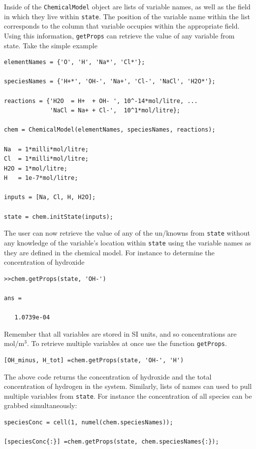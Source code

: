 \documentclass{article}
\begin{document}
Inside of the \verb|ChemicalModel| object are lists of variable names, as well as the field in which they live within \verb|state|. The position of the variable name within the list corresponds to the column that variable occupies within the appropriate field. Using this information, \verb|getProps| can retrieve the value of any variable from state. Take the simple example
\begin{lstlisting}
elementNames = {'O', 'H', 'Na*', 'Cl*'};

speciesNames = {'H+*', 'OH-', 'Na+', 'Cl-', 'NaCl', 'H2O*'};

reactions = {'H2O  = H+  + OH- ', 10^-14*mol/litre, ...
             'NaCl = Na+ + Cl-',  10^1*mol/litre};

chem = ChemicalModel(elementNames, speciesNames, reactions);

Na  = 1*milli*mol/litre;
Cl  = 1*milli*mol/litre;
H2O = 1*mol/litre;
H   = 1e-7*mol/litre;

inputs = [Na, Cl, H, H2O];

state = chem.initState(inputs);
\end{lstlisting}
The user can now retrieve the value of any of the un/knowns from \verb|state| without any knowledge of the variable's location within \verb|state| using the variable names as they are defined in the chemical model. For instance to determine the concentration of hydroxide

\begin{lstlisting}
>>chem.getProps(state, 'OH-')

ans =

   1.0739e-04
\end{lstlisting}
Remember that all variables are stored in SI units, and so concentrations are mol/m$^3$. To retrieve multiple variables at once use the function \verb|getProps|.

\begin{lstlisting}
[OH_minus, H_tot] =chem.getProps(state, 'OH-', 'H')
\end{lstlisting}
The above code returns the concentration of hydroxide and the total concentration of hydrogen in the system. Similarly, lists of names can used to pull multiple variables from \verb|state|. For instance the concentration of all species can be grabbed simultaneously:

\begin{lstlisting}
speciesConc = cell(1, numel(chem.speciesNames));

[speciesConc{:}] =chem.getProps(state, chem.speciesNames{:});
\end{lstlisting}
\end{document}
